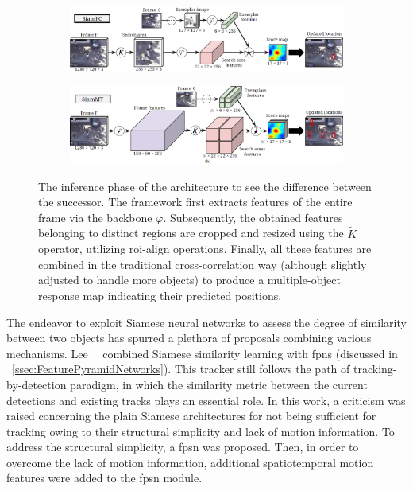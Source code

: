 \begin{figure}[!t]
    \centering
    \begin{subfigure}[b]{\textwidth}
        \centering
        \includegraphics[width=\textwidth]{figures/theoretical_foundations/siammt_orig.png}
        \caption[]{}
    \end{subfigure}
    \begin{subfigure}[b]{\textwidth}
        \centering
        \includegraphics[width=\textwidth]{figures/theoretical_foundations/siammt_new.png}
        \caption[]{}
    \end{subfigure}
    \caption[]{The inference phase of the  \siamfc{} architecture to see the difference between the  \siammt{} successor. The \siammt{} framework first extracts features of the entire frame via the backbone $\varphi$. Subsequently, the obtained features belonging to distinct regions are cropped and resized using the $\tilde{K}$ operator, utilizing \gls{roi}-align operations. Finally, all these features are combined in the traditional cross-correlation way (although slightly adjusted to handle more objects) to produce a multiple-object response map indicating their predicted positions. }
    \label{fig:SiamMTArchitecture}
\end{figure}

The endeavor to exploit Siamese neural networks to assess the degree of similarity between two objects has spurred a plethora of proposals combining various mechanisms. Lee~\etal{}~\cite{lee2019motfpsn} combined Siamese similarity learning with \Glspl{fpn} (discussed in \sectiontext{}~\ref{ssec:FeaturePyramidNetworks}). This tracker still follows the path of tracking-by-detection paradigm, in which the similarity metric between the current detections and existing tracks plays an essential role. In this work, a criticism was raised concerning the plain Siamese architectures for not being sufficient for tracking owing to their structural simplicity and lack of motion information. To address the structural simplicity, a \gls{fpsn} was proposed. Then, in order to overcome the lack of motion information, additional spatiotemporal motion features were added to the \gls{fpsn} module.

